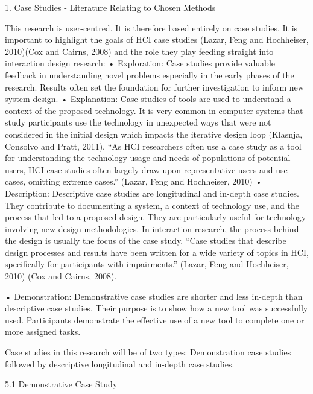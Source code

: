 1.	Case Studies - Literature Relating to Chosen Methods  

This research is user-centred. It is therefore based entirely on case studies. It is important to highlight the goals of HCI case studies (Lazar, Feng and Hochheiser, 2010)(Cox and Cairns, 2008) and the role they play feeding straight into interaction design research:
•	Exploration: Case studies provide valuable feedback in understanding novel problems especially in the early phases of the research.  Results often set the foundation for further investigation to inform new system design. 
•	Explanation: Case studies of tools are used to understand a context of the proposed technology.  It is very common in computer systems that study participants use the technology in unexpected ways that were not considered in the initial design which impacts the iterative design loop (Klasnja, Consolvo and Pratt, 2011).     
“As HCI researchers often use a case study as a tool for understanding the technology usage and needs of populations of potential users, HCI case studies often largely draw upon representative users and use cases, omitting extreme cases.” (Lazar, Feng and Hochheiser, 2010)
•	Description: Descriptive case studies are longitudinal and in-depth case studies.  They contribute to documenting a system, a context of technology use, and the process that led to a proposed design. They are particularly useful for technology involving new design methodologies. In interaction  research, the process behind the design is usually the focus of the case study.  “Case studies that describe design processes and results have been written for a wide variety of topics in HCI, specifically for participants with impairments.” (Lazar, Feng and Hochheiser, 2010) (Cox and Cairns, 2008).   

•	Demonstration: Demonstrative case studies are shorter and less in-depth than descriptive case studies.  Their purpose is to show how a new tool was successfully used.  Participants demonstrate the effective use of a new tool to complete one or more assigned tasks.  

Case studies in this research will be of two types: Demonstration case studies followed by descriptive longitudinal and in-depth case studies.

5.1 Demonstrative Case Study 

